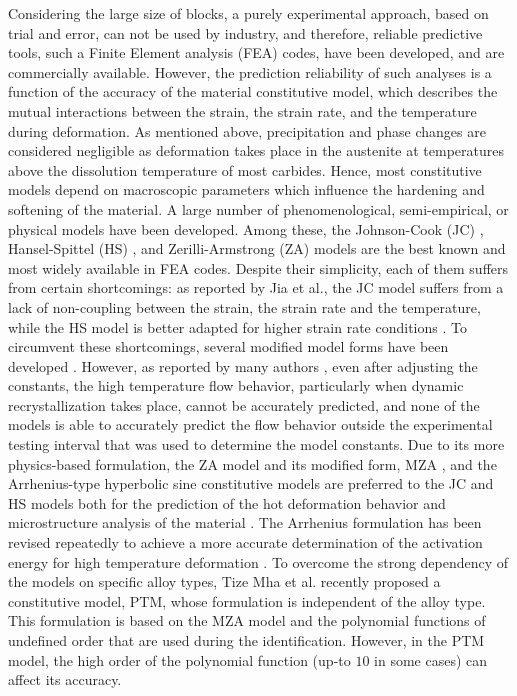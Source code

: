 \documentclass[metals,article,submit,pdftex,moreauthors]{Definitions/mdpi}
\makeatletter
\DeclareRobustCommand{\eal}{et al.\@\xspace}
\makeatother
\begin{document}
Considering the large size of blocks, a purely experimental approach, based on trial and error, can not be used by industry, and therefore, reliable predictive tools, such a Finite Element analysis (FEA) codes, have been developed, and are commercially available.
However, the prediction reliability of such analyses is a function of the accuracy of the material constitutive model, which describes the mutual interactions between the strain, the strain rate, and the temperature during deformation.
As mentioned above, precipitation and phase changes are considered negligible as deformation takes place in the austenite at temperatures above the dissolution temperature of most carbides.
Hence, most constitutive models depend on macroscopic parameters which influence the hardening and softening of the material.
A large number of phenomenological, semi-empirical, or physical models \cite{jia2022thermo, costa2016study, rudnytskyj2020constitutive, Pantale-2021} have been developed.
Among these, the Johnson-Cook (JC) \cite{Johnson-1983}, Hansel-Spittel (HS) \cite{chadha2018approach}, and Zerilli-Armstrong (ZA) \cite{Zerilli-1987} models are the best known and most widely available in FEA codes.
Despite their simplicity, each of them suffers from certain shortcomings: as reported by Jia \eal \cite{Jia-2021}, the JC model suffers from a lack of non-coupling between the strain, the strain rate and the temperature, while the HS model is better adapted for higher strain rate conditions \cite{chadha2018approach}.
To circumvent these shortcomings, several modified model forms have been developed \cite{chadha2018approach, liu2021modified, jia2022thermo1, bai2022comparison, zhu2022constitutive, jia2021modified, sim2022modified}.
However, as reported by many authors \cite{Li-2013, Zhang-2015, Zhou-2019}, even after adjusting the constants, the high temperature flow behavior, particularly when dynamic recrystallization takes place, cannot be accurately predicted, and none of the models is able to accurately predict the flow behavior outside the experimental testing interval that was used to determine the model constants.
Due to its more physics-based formulation, the ZA model and its modified form, MZA \cite{ovesy2020explicit, niu2020constitutive, Muralli-2017, Cheng-2021, Muralli-2021}, and the Arrhenius-type hyperbolic sine constitutive models are preferred to the JC and HS models both for the prediction of the hot deformation behavior and microstructure analysis of the material \cite{derazkola2021review, wang2022deformation, miao2022deformation}.
The Arrhenius formulation has been revised repeatedly to achieve a more accurate determination of the activation energy for high temperature deformation \cite{rudnytskyj2022investigating, ji2020optimization}.
To overcome the strong dependency of the models on specific alloy types, Tize Mha \eal \cite{TizeMha-2022} recently proposed a constitutive model, PTM, whose formulation is independent of the alloy type.
This formulation is based on the MZA model and the polynomial functions of undefined order that are used during the identification.
However, in the PTM model, the high order of the polynomial function (up-to $10$ in some cases) can affect its accuracy.
\end{document}

